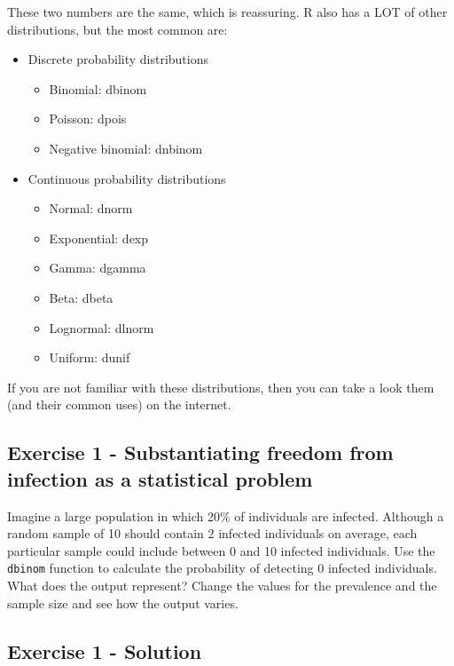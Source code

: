 \documentclass[
  12pt,
]{article}
\providecommand{\tightlist}{%
  \setlength{\itemsep}{0pt}\setlength{\parskip}{0pt}}
\begin{document}
These two numbers are the same, which is reassuring. R also has a LOT of
other distributions, but the most common are:

\begin{itemize}
\tightlist
\item
  Discrete probability distributions

  \begin{itemize}
  \tightlist
  \item
    Binomial: dbinom
  \item
    Poisson: dpois
  \item
    Negative binomial: dnbinom
  \end{itemize}
\item
  Continuous probability distributions

  \begin{itemize}
  \tightlist
  \item
    Normal: dnorm
  \item
    Exponential: dexp
  \item
    Gamma: dgamma
  \item
    Beta: dbeta
  \item
    Lognormal: dlnorm
  \item
    Uniform: dunif
  \end{itemize}
\end{itemize}

If you are not familiar with these distributions, then you can take a
look them (and their common uses) on the internet.

\hypertarget{exercise-1---substantiating-freedom-from-infection-as-a-statistical-problem}{%
\subsection{Exercise 1 - Substantiating freedom from infection as a
statistical
problem}\label{exercise-1---substantiating-freedom-from-infection-as-a-statistical-problem}}

Imagine a large population in which 20\% of individuals are infected.
Although a random sample of 10 should contain 2 infected individuals on
average, each particular sample could include between 0 and 10 infected
individuals. Use the \texttt{dbinom} function to calculate the
probability of detecting 0 infected individuals. What does the output
represent? Change the values for the prevalence and the sample size and
see how the output varies.

\hypertarget{exercise-1---solution}{%
\subsection{Exercise 1 - Solution}\label{exercise-1---solution}}
\end{document}
